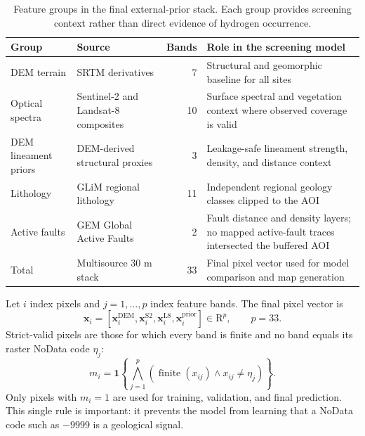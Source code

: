 \documentclass[numrefs]{interact}
\let\cite\citep
\theoremstyle{plain}%
\theoremstyle{definition}
\theoremstyle{remark}
\begin{document}
\begin{table}[t]
\centering
\caption{Feature groups in the final external-prior stack. Each group provides screening context rather than direct evidence of hydrogen occurrence.}
\label{tab:feature-sources}
\begin{tabular}{p{}p{}rp{}}
\toprule
Group & Source & Bands & Role in the screening model \\
\midrule
DEM terrain & SRTM derivatives \cite{farr2007srtm} & 7 & Structural and geomorphic baseline for all sites \\
Optical spectra & Sentinel-2 and Landsat-8 composites \cite{drusch2012sentinel,roy2014landsat8} & 10 & Surface spectral and vegetation context where observed coverage is valid \\
DEM lineament priors & DEM-derived structural proxies & 3 & Leakage-safe lineament strength, density, and distance context \\
Lithology & GLiM regional lithology \cite{hartmann2012glim} & 11 & Independent regional geology classes clipped to the AOI \\
Active faults & GEM Global Active Faults \cite{styron2020gem} & 2 & Fault distance and density layers; no mapped active-fault traces intersected the buffered AOI \\
Total & Multisource 30 m stack & 33 & Final pixel vector used for model comparison and map generation \\
\bottomrule
\end{tabular}
\end{table}

Let \(i\) index pixels and \(j=1,\ldots,p\) index feature bands. The final pixel vector is
\begin{equation}
    \mathbf{x}_i =
    \left[
    \mathbf{x}^{\mathrm{DEM}}_i,
    \mathbf{x}^{\mathrm{S2}}_i,
    \mathbf{x}^{\mathrm{L8}}_i,
    \mathbf{x}^{\mathrm{prior}}_i
    \right] \in \mathrm{R}^{p},
    \qquad p=33 .
    \label{eq:feature-vector}
\end{equation}
Strict-valid pixels are those for which every band is finite and no band equals its raster NoData code \(\eta_j\):
\begin{equation}
    m_i =
    \mathbf{1}
    \left\{
    \bigwedge_{j=1}^{p}
    \left(
    \operatorname{finite}(x_{ij})
    \land
    x_{ij} \ne \eta_j
    \right)
    \right\}.
    \label{eq:strict-valid}
\end{equation}
Only pixels with \(m_i=1\) are used for training, validation, and final prediction. This single rule is important: it prevents the model from learning that a NoData code such as \(-9999\) is a geological signal.
\end{document}
